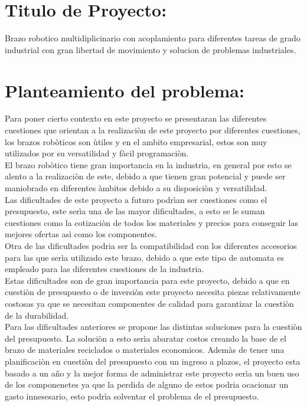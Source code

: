 \documentclass[14pt,a4paper]{article}
\begin{document}
\newpage

\section{Titulo de Proyecto:}

Brazo robotico multidiplicinario con acoplamiento para diferentes tareas de grado industrial con gran libertad de movimiento y solucion de problemas industriales.


\section{Planteamiento del problema:}

Para poner cierto contexto en este proyecto se presentaran las diferentes cuestiones que orientan a la realizaciòn de este proyecto  por diferentes cuestiones, los brazos robòticos son ùtiles y en el ambito empresarial, estos son muy utilizados por su versatilidad y fàcil programaciòn.\\
El brazo robòtico tiene gran importancia en la industria, en general por esto se alento a la realizaciòn de este, debido a que tienen gran potencial y puede ser maniobrado en diferentes àmbitos debido a su disposiciòn y versatilidad.\\
Las dificultades de este proyecto a futuro podrìan ser cuestiones como el presupuesto, este serìa una de las mayor dificultades, a esto se le suman cuestiones como la cotizaciòn de todos los materiales y precios para conseguir las mejores ofertas asì como los componentes.\\
Otra de las dificultades podria ser la compatibilidad con los diferentes accesorios para las que serìa utilizado este brazo, debido a que 
este tipo de automata es empleado para las diferentes cuestiones de la industria.\\
Estas dificultades son de gran importancia para este proyecto, debido a que en cuestiòn de presupuesto o de inversiòn este proyecto necesita piezas relativamente costosas ya que se necesitan componentes de calidad para garantizar la cuestiòn de la durabilidad.\\
Para las dificultades anteriores se propone las distintas soluciones para la cuestiòn del presupuesto. La soluciòn a esto serìa abaratar costos creando la base de el brazo de materiales reciclados o materiales economicos. Ademàs de tener una planificaciòn en cuestiòn del presupuesto con un ingreso a plazos, el proyecto esta basado a un año y la mejor forma de administrar este proyecto serìa un buen uso de los componenetes ya que la perdida de alguno de estos podria ocacionar un gasto innesesario, esto podrìa solventar el problema de el presupuesto.\\
\end{document}

